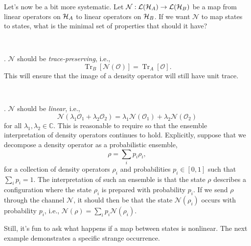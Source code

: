 \documentclass[a4paper,11pt]{article}
\DeclareMathOperator{\Tr}{Tr}
\newcommand{\Hil}{{\cal H}}
\newcommand{\Oh}{{\mathcal{O}}}
\begin{document}
Let's now be a bit more systematic.
Let $\mathcal{N} : \mathcal{L}(\Hil_A) \rightarrow \mathcal{L}(\Hil_B)$ be a map from linear operators on $\Hil_A$ to linear operators on $\Hil_B$.
If we want $\mathcal{N}$ to map states to states, what is the minimal set of properties that should it have?

~

. $\mathcal{N}$ should be \emph{trace-preserving}, i.e.,
\begin{equation}
\Tr_B[\mathcal{N}(\Oh)] = \Tr_A[\Oh].
\end{equation}
This will ensure that the image of a density operator will still have unit trace.

~

. $\mathcal{N}$ should be \emph{linear}, i.e.,
\begin{equation}
\mathcal{N}(\lambda_1 \Oh_1 + \lambda_2 \Oh_2) = \lambda_1 \mathcal{N}(\Oh_1) + \lambda_2 \mathcal{N}(\Oh_2)
\end{equation}
for all $\lambda_1, \lambda_2 \in \mathbb{C}$.
This is reasonable to require so that the ensemble interpretation of density operators continues to hold.
Explicitly, suppose that we decompose a density operator as a probabilistic ensemble,
\begin{equation}
\rho = \sum_i p_i \rho_i,
\end{equation}
for a collection of density operators $\rho_i$ and probabilities $p_i \in [0,1]$ such that $\sum_i p_i = 1$.
The interpretation of such an ensemble is that the state $\rho$ describes a configuration where the state $\rho_i$ is prepared with probability $p_i$.
If we send $\rho$ through the channel $\mathcal{N}$, it should then be that the state $\mathcal{N}(\rho_i)$ occurs with probability $p_i$, i.e., $\mathcal{N}(\rho) = \sum_i p_i \mathcal{N}(\rho_i)$.

Still, it's fun to ask what happens if a map between states is nonlinear.
The next example demonstrates a specific strange occurrence.
\end{document}
